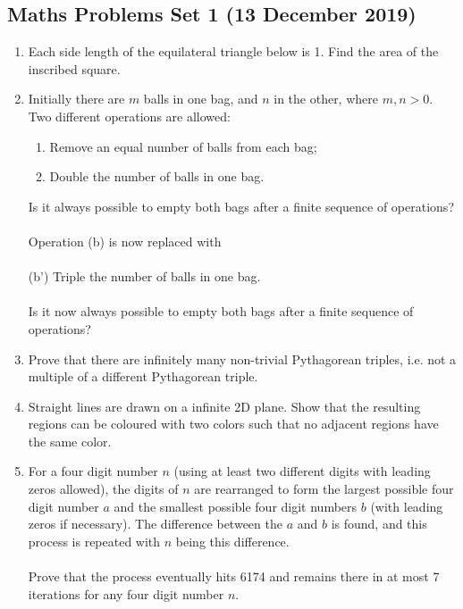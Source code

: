 \documentclass{article}
\begin{document}
\begin{center}
    \section*{Maths Problems Set 1 (13 December 2019)}
\end{center}

\begin{enumerate}
    \item
    Each side length of the equilateral triangle below is 1. Find the area of the inscribed square.\\
    
    \item
    Initially there are $m$ balls in one bag, and $n$ in the other, where $m, n > 0$. Two different operations are allowed:
    \begin{enumerate}
        \item Remove an equal number of balls from each bag;
        \item Double the number of balls in one bag.
    \end{enumerate}
    Is it always possible to empty both bags after a finite sequence of operations?\\\\
    Operation (b) is now replaced with\\\\
    (b') Triple the number of balls in one bag.\\\\
    Is it now always possible to empty both bags after a finite sequence of operations?
    
    \item
    Prove that there are infinitely many non-trivial Pythagorean triples, i.e. not a multiple of a different Pythagorean triple.
    
    \item
    Straight lines are drawn on a infinite 2D plane. Show that the resulting regions can be coloured with two colors such that no adjacent regions have the same color.
    
    \item
    For a four digit number $n$ (using at least two different digits with leading zeros allowed), the digits of $n$ are rearranged to form the largest possible four digit number $a$ and the smallest possible four digit numbers $b$ (with leading zeros if necessary). The difference between the $a$ and $b$ is found, and this process is repeated with $n$ being this difference.\\
    \\
    Prove that the process eventually hits 6174 and remains there in at most 7 iterations for any four digit number $n$.
    

\end{enumerate}
\end{document}
